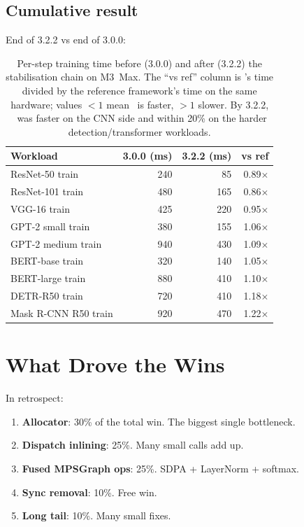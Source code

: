 \subsection{Cumulative result}
\label{ssec:stabilization:cumulative}

End of 3.2.2 vs end of 3.0.0:

\begin{table}[t]
\centering
\small
\begin{tabular}{lrrr}
\toprule
Workload & 3.0.0 (ms) & 3.2.2 (ms) & vs ref \\
\midrule
ResNet-50 train       & 240 & 85  & 0.89$\times$ \\
ResNet-101 train      & 480 & 165 & 0.86$\times$ \\
VGG-16 train          & 425 & 220 & 0.95$\times$ \\
GPT-2 small train     & 380 & 155 & 1.06$\times$ \\
GPT-2 medium train    & 940 & 430 & 1.09$\times$ \\
BERT-base train       & 320 & 140 & 1.05$\times$ \\
BERT-large train      & 880 & 410 & 1.10$\times$ \\
DETR-R50 train        & 720 & 410 & 1.18$\times$ \\
Mask R-CNN R50 train  & 920 & 470 & 1.22$\times$ \\
\bottomrule
\end{tabular}
\caption[Stabilisation chain results.]{Per-step training time
before (3.0.0) and after (3.2.2) the stabilisation chain on
M3~Max. The ``vs ref'' column is \Lucid's time divided by the
reference framework's time on the same hardware; values
$<1$ mean \Lucid\ is faster, $>1$ slower. By 3.2.2, \Lucid\ was
faster on the CNN side and within 20\% on the harder
detection/transformer workloads.}
\label{tab:stabilization:cumulative}
\end{table}

\section{What Drove the Wins}
\label{sec:stabilization:what_drove}

In retrospect:

\begin{enumerate}
  \item \textbf{Allocator}: 30\% of the total win. The biggest
    single bottleneck.
  \item \textbf{Dispatch inlining}: 25\%. Many small calls add
    up.
  \item \textbf{Fused MPSGraph ops}: 25\%. SDPA + LayerNorm
    + softmax.
  \item \textbf{Sync removal}: 10\%. Free win.
  \item \textbf{Long tail}: 10\%. Many small fixes.
\end{enumerate}


